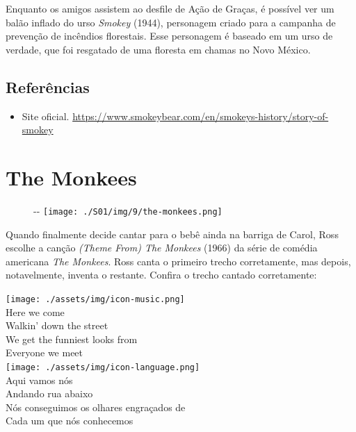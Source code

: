 Enquanto os amigos assistem ao desfile de Ação de Graças, é possível ver
um balão inflado do urso \emph{Smokey} (1944), personagem criado para a
campanha de prevenção de incêndios florestais. Esse personagem é baseado
em um urso de verdade, que foi resgatado de uma floresta em chamas no
Novo México.

\hypertarget{referuxeancias-4}{%
\subsection{Referências}\label{referuxeancias-4}}

\begin{itemize}
\tightlist
\item
  \sloppy Site oficial. \url{https://www.smokeybear.com/en/smokeys-history/story-of-smokey}
\end{itemize}

\hypertarget{the-monkees}{%
\section{The Monkees}\label{the-monkees}}

\begin{figure}[!ht]
  \begin{adjustwidth}{-\oddsidemargin-1in}{-\rightmargin}
    \centering
    \texttt{[image: ./S01/img/9/the-monkees.png]}
  \end{adjustwidth}
\end{figure}

Quando finalmente decide cantar para o bebê ainda na barriga de Carol,
Ross escolhe a canção \emph{(Theme From) The Monkees} (1966) da série de
comédia americana \emph{The Monkees}. Ross canta o primeiro trecho
corretamente, mas depois, notavelmente, inventa o restante. Confira o
trecho cantado corretamente:

\bigskip
\begin{tcolorbox}[enhanced,
    drop fuzzy shadow southeast, boxrule=0.3pt,
    lower separated=false, sidebyside, sidebyside align=top,
    halign=flush right, halign lower=left,
    colframe=black!30!dialogoBorder,colback=musicaBg]
\texttt{[image: ./assets/img/icon-music.png]}\\
Here we come\\Walkin’ down the street\\We get the funniest looks from\\Everyone we meet\\
\tcblower
\texttt{[image: ./assets/img/icon-language.png]}\\
Aqui vamos nós\\Andando rua abaixo\\Nós conseguimos os olhares engraçados de\\Cada um que nós conhecemos\\
\end{tcolorbox}

